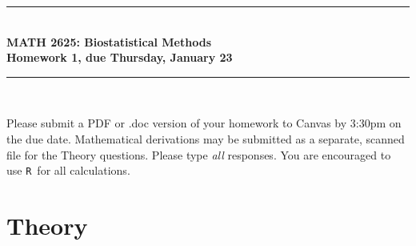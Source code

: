 \documentclass{article}
\newcommand{\HRule}{\rule{\linewidth}{0.5mm}}
\newcommand{\R}{\texttt{R}}
\begin{document}
	\begin{center}
		\HRule \\[0.1cm]
		\vspace{0.1cm}
		{ \LARGE \bfseries MATH 2625: Biostatistical Methods\\[0.5cm] Homework 1, due Thursday, January 23 } \\[0.1cm]
		\HRule \\[0.1cm]
	\end{center}
	
	Please submit a PDF or .doc version of your homework to Canvas by 3:30pm on the due date. Mathematical derivations may be submitted as a separate, scanned file for the Theory questions. Please type \emph{all} responses. You are encouraged to use \R\ for all calculations.
		
	\section*{Theory}
\end{document}
